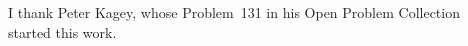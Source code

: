 \documentclass[ECP,preprint]{ejpecp}
\begin{document}




\appendix




\begin{acks}[Acknowledgments]
I thank Peter Kagey, whose Problem~131 in his Open Problem
Collection~\cite{kagey131} started this work.
\end{acks}
\end{document}
